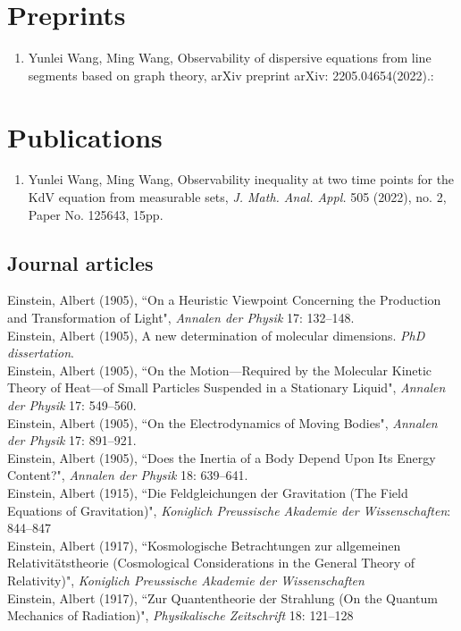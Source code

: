 \documentclass[11pt]{article} %
\begin{document}
\section*{Preprints}
\begin{enumerate}
  \leftskip-0.13in
\item Yunlei Wang, Ming Wang, Observability of dispersive equations from line segments based on graph theory, arXiv preprint arXiv: 2205.04654(2022).:
\end{enumerate}

\section*{Publications}
\begin{enumerate}
\leftskip-0.13in
\item Yunlei Wang, Ming Wang, Observability inequality at two time points for the KdV equation from measurable sets, \emph{J. Math. Anal. Appl.} 505 (2022), no. 2, Paper No. 125643, 15pp.
\end{enumerate}
\iffalse
\subsection*{Journal articles}


Einstein, Albert (1905), “On a Heuristic Viewpoint Concerning the Production and Transformation of Light", \emph{Annalen der Physik} 17: 132–148.\\
Einstein, Albert (1905), A new determination of molecular dimensions. \emph{PhD dissertation}.\\
Einstein, Albert (1905), “On the Motion—Required by the Molecular Kinetic Theory of Heat—of Small Particles Suspended in a Stationary Liquid", \emph{Annalen der Physik} 17: 549–560.\\
Einstein, Albert (1905), “On the Electrodynamics of Moving Bodies", \emph{Annalen der Physik} 17: 891–921.\\
Einstein, Albert (1905), “Does the Inertia of a Body Depend Upon Its Energy Content?", \emph{Annalen der Physik} 18: 639–641.\\
Einstein, Albert (1915), “Die Feldgleichungen der Gravitation (The Field Equations of Gravitation)", \emph{Koniglich Preussische Akademie der Wissenschaften}: 844–847\\
Einstein, Albert (1917), “Kosmologische Betrachtungen zur allgemeinen Relativitätstheorie (Cosmological Considerations in the General Theory of Relativity)", \emph{Koniglich Preussische Akademie der Wissenschaften}\\
Einstein, Albert (1917), “Zur Quantentheorie der Strahlung (On the Quantum Mechanics of Radiation)", \emph{Physikalische Zeitschrift} 18: 121–128
\end{document}
